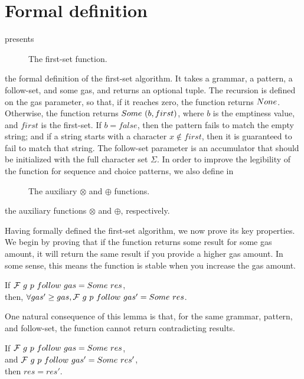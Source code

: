 \section{Formal definition}

 presents
\begin{figure}
    \centering
    
    \caption{The first-set function.}
    \label{fig:firstcomp}
\end{figure}
the formal definition of the first-set algorithm.
It takes a grammar, a pattern, a follow-set,
and some gas, and returns an optional tuple.
The recursion is defined on the gas parameter,
so that, if it reaches zero,
the function returns $None$.
Otherwise, the function returns $Some\ (b, first)$,
where $b$ is the emptiness value,
and $first$ is the first-set.
If $b=false$,
then the pattern fails to match the empty string;
and if a string starts with a character
$x \notin first$,
then it is guaranteed to fail to match that string.
The follow-set parameter is an
accumulator that should be initialized with
the full character set $\Sigma$.
In order to improve the legibility
of the function for sequence and choice patterns,
we also define
in 
\begin{figure}
    \centering
    
    
    \caption{The auxiliary $\otimes$ and $\oplus$ functions.}
    \label{fig:firstaux}
\end{figure}
the auxiliary functions $\otimes$ and $\oplus$,
respectively.

Having formally defined the first-set algorithm,
we now prove its key properties.
We begin by proving that if the function returns
some result for some gas amount,
it will return the same result if you provide
a higher gas amount.
In some sense, this means the function is stable
when you increase the gas amount.

\begin{lemma}
If $\mathcal{F}{}\ g\ p\ follow\ gas = Some\ res$, \\
then, $\forall gas' \ge gas, \mathcal{F}{}\ g\ p\ follow\ gas' = Some\ res$.
\end{lemma}

One natural consequence of this lemma is that,
for the same grammar, pattern, and follow-set,
the function cannot return contradicting results.

\begin{lemma}
If $\mathcal{F}{}\ g\ p\ follow\ gas = Some\ res$, \\
and $\mathcal{F}{}\ g\ p\ follow\ gas' = Some\ res'$, \\
then $res = res'$.
\end{lemma}

